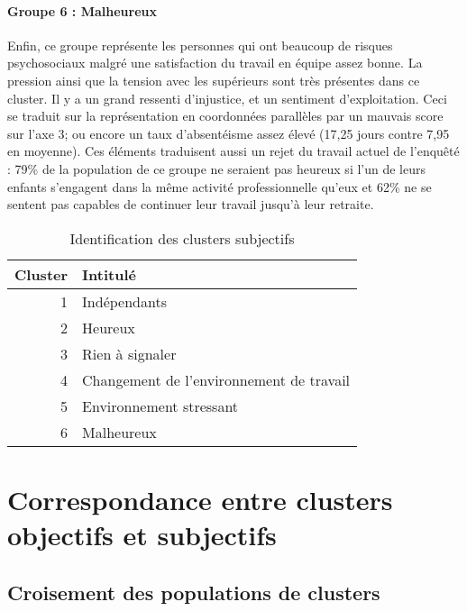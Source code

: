 \documentclass[11pt,fleqn,a4paper,openany,frenchb]{book} %
\begin{document}
\paragraph{Groupe 6 : Malheureux\\}
Enfin, ce groupe représente les personnes qui ont beaucoup de risques psychosociaux malgré une satisfaction du travail en équipe assez bonne. La pression ainsi que la tension avec les supérieurs sont très présentes dans ce cluster. Il y a un grand ressenti d'injustice, et un sentiment d'exploitation. Ceci se traduit sur la représentation en coordonnées parallèles par un mauvais score sur l'axe 3; ou encore un taux d'absentéisme assez élevé (17,25 jours contre 7,95 en moyenne). Ces éléments traduisent aussi un rejet du travail actuel de l'enquêté : 79\% de la population de ce groupe ne seraient pas heureux si l'un de leurs enfants s'engagent dans la même activité professionnelle qu'eux et 62\% ne se sentent pas capables de continuer leur travail jusqu'à leur retraite.



\begin{table}[!h]
\centering
\begin{tabular}{|r||p{6cm}|}
\hline
 Cluster & Intitulé \\
 \hline
 1 & Indépendants\\ 
 \hline
 2 & Heureux \\
  \hline
 3 & Rien à signaler \\
  \hline
 4 & Changement de l'environnement de travail \\
  \hline
 5 & Environnement stressant\\
  \hline
 6 & Malheureux\\
  \hline
\end{tabular}%
\caption{Identification des clusters subjectifs}

\label{tab:nom_clusters_subj}
\end{table}


\section{Correspondance entre clusters objectifs et subjectifs }
\subsection{Croisement des populations de clusters}
\end{document}
